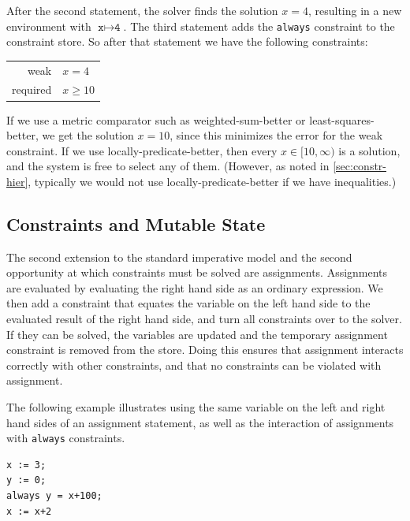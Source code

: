 After the second statement, the solver finds the solution $x=4$,
resulting in a new environment with $\texttt{x} \mapsto \texttt{4}$.  The
third statement adds the \texttt{always} constraint to the constraint
store.  So after that statement we have the following constraints:
\begin{center}
\begin{tabular}{rl}
weak     & $x=4$ \\
required & $x \geq 10$
\end{tabular}
\end{center}
If we use a metric comparator such as weighted-sum-better or
least-squares-better, we get the solution $x=10$, since this minimizes
the error for the weak constraint.  If we use
locally-predicate-better, then every $x \in [10,\infty)$ is a
solution, and the system is free to select any of them.  (However, as
noted in \autoref{sec:constr-hier}, typically we would not use
locally-predicate-better if we have inequalities.)

\subsection{Constraints and Mutable State}
\label{sec:constr-mutable-state}
The second extension to the standard imperative model and the second
opportunity at which constraints must be solved are
assignments. Assignments are evaluated by evaluating the right hand
side as an ordinary expression. We then add a constraint
that equates the variable on the left hand side to the evaluated
result of the right hand side, and turn all constraints over to the
solver. If they can be solved, the variables are updated and the
temporary assignment constraint is removed from the store. Doing this
ensures that assignment interacts correctly with other constraints,
and that no constraints can be violated with assignment.

The following example illustrates using the same variable on the left
and right hand sides of an assignment statement, as well as the
interaction of assignments with \verb|always| constraints.
\begin{lstlisting}
x := 3;
y := 0;
always y = x+100;
x := x+2
\end{lstlisting}

